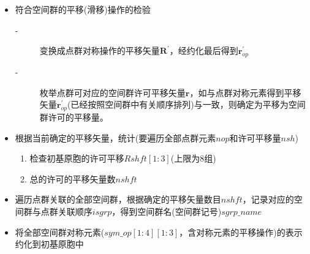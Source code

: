 \begin{itemize}
		校正坐标系贡献后，点群对称操作的平移矢量$\mathbf{R}^{\prime}$为
		\begin{displaymath}
			\mathbf{R}^{\prime}=\mathbf{r}^{\prime}+\mathbf{R}_{sh}^{\mathrm{coor}}=\mathbf{r}^{\prime}+(\mathbf{g}-\mathbf{E})^{-1}(\mathbf{r}-\mathbf{r}^{\prime})
		\end{displaymath}

	\item 符合空间群的平移(滑移)操作的检验
		\begin{description}
			\item[-] 变换成点群对称操作的平移矢量$\mathbf{R}^{\prime}$，经约化最后得到$\mathbf{r}_{op}^{\prime}$
			\item[-] 枚举点群可对应的空间群许可平移矢量$\mathbf{r}$，如与点群对称元素得到平移矢量$\mathbf{r}_{op}^{\prime}$(已经按照空间群中有关顺序排列)与一致，则确定为平移为空间群许可的平移量。
		\end{description}
	\item 根据当前确定的平移矢量，统计(要遍历全部点群元素$\mathit{nop}$和许可平移量$\mathit{nsh}$)
		\begin{enumerate}
			\item 检查初基原胞的许可平移$Rshft[1:3]$(上限为8组)
			\item 总的许可的平移矢量数$\mathit{nshft}$
		\end{enumerate}
	\item 遍历点群关联的全部空间群，根据确定的平移矢量数目$\mathit{nshft}$，记录对应的空间群与点群关联顺序$\mathit{isgrp}$，得到空间群名(空间群记号)$\mathit{sgrp\_name}$
	\item 将全部空间群对称元素($\mathit{sym\_op}[1:4][1:3]$，含对称元素的平移操作)的表示约化到初基原胞中
\end{itemize}
